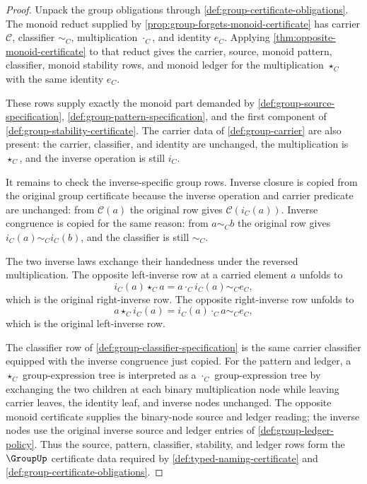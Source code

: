 \begin{proof}
Unpack the group obligations through \autoref{def:group-certificate-obligations}. The monoid reduct supplied by \autoref{prop:group-forgets-monoid-certificate} has carrier $\mathcal C$, classifier $\sim_C$, multiplication $\cdot_C$, and identity $e_C$. Applying \autoref{thm:opposite-monoid-certificate} to that reduct gives the carrier, source, monoid pattern, classifier, monoid stability rows, and monoid ledger for the multiplication $\star_C$ with the same identity $e_C$.

These rows supply exactly the monoid part demanded by \autoref{def:group-source-specification}, \autoref{def:group-pattern-specification}, and the first component of \autoref{def:group-stability-certificate}. The carrier data of \autoref{def:group-carrier} are also present: the carrier, classifier, and identity are unchanged, the multiplication is $\star_C$, and the inverse operation is still $i_C$.

It remains to check the inverse-specific group rows. Inverse closure is copied from the original group certificate because the inverse operation and carrier predicate are unchanged: from $\mathcal C(a)$ the original row gives $\mathcal C(i_C(a))$. Inverse congruence is copied for the same reason: from $a\sim_C b$ the original row gives $i_C(a)\sim_C i_C(b)$, and the classifier is still $\sim_C$.

The two inverse laws exchange their handedness under the reversed multiplication. The opposite left-inverse row at a carried element $a$ unfolds to
$$
i_C(a)\star_C a=a\cdot_C i_C(a)\sim_C e_C,
$$
which is the original right-inverse row. The opposite right-inverse row unfolds to
$$
a\star_C i_C(a)=i_C(a)\cdot_C a\sim_C e_C,
$$
which is the original left-inverse row.

The classifier row of \autoref{def:group-classifier-specification} is the same carrier classifier equipped with the inverse congruence just copied. For the pattern and ledger, a $\star_C$ group-expression tree is interpreted as a $\cdot_C$ group-expression tree by exchanging the two children at each binary multiplication node while leaving carrier leaves, the identity leaf, and inverse nodes unchanged. The opposite monoid certificate supplies the binary-node source and ledger reading; the inverse nodes use the original inverse source and ledger entries of \autoref{def:group-ledger-policy}. Thus the source, pattern, classifier, stability, and ledger rows form the $\GroupUp$ certificate data required by \autoref{def:typed-naming-certificate} and \autoref{def:group-certificate-obligations}.
\end{proof}
